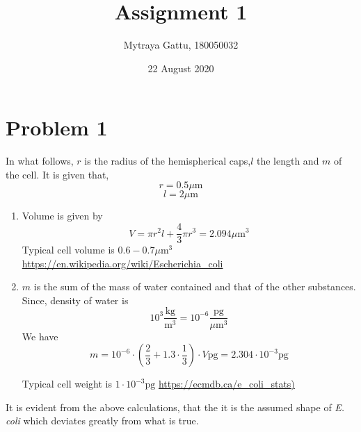 \documentclass[a4paper]{article}
\title{Assignment 1}
\author{Mytraya Gattu, 180050032}
\date{22 August 2020}
\begin{document}
\maketitle
\section{Problem 1}
In what follows, $r$ is the radius of the hemispherical caps,$l$ the length and $m$ of the cell. It is given that, 
$$r=0.5\mu \text{m}$$
$$l=2\mu \text{m}$$
\begin{enumerate}[label=(\alph*)]
  \item Volume is given by $$V=\pi r^2 l + \frac{4}{3}\pi r^{3} = 2.094 \mu \text{m}^{3}$$
  Typical cell volume is $0.6-0.7 \mu \text{m}^{3}$
  \newline
  \url{https://en.wikipedia.org/wiki/Escherichia_coli}
  \item $m$ is the sum of the mass of water contained and that of the other substances. Since, density of water is $$10^3 \frac{\text{kg}}{\text{m}^3}=10^{-6} \frac{\text{pg}}{\mu \text{m}^3}$$
  We have
  $$m=10^{-6} \cdot \left(\frac{2}{3} + 1.3\cdot \frac{1}{3}\right)\cdot V \text{pg} = 2.304 \cdot 10^{-3} \text{pg}$$
  
  Typical cell weight is $1\cdot 10^{-3} \text{pg}$ \newline \url{https://ecmdb.ca/e_coli_stats)}
\end{enumerate}
It is evident from the above calculations, that the it is the assumed shape of \textit{E. coli} which deviates greatly from what is true. 
\pagebreak 
\end{document}
